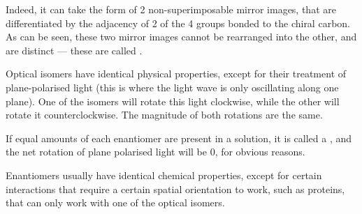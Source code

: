 			Indeed, it can take the form of 2 non-superimposable mirror images, that are differentiated by the adjacency of 2 of
			the 4 groups bonded to the chiral carbon. As can be seen, these two mirror images cannot be rearranged into the other,
			and are distinct --- these are called .



			Optical isomers have identical physical properties, except for their treatment of plane-polarised light (this is
			where the light wave is only oscillating along one plane). One of the isomers will rotate this light clockwise, while the
			other will rotate it counterclockwise. The magnitude of both rotations are the same.

			If equal amounts of each enantiomer are present in a solution, it is called a , and the net
			rotation of plane polarised light will be 0, for obvious reasons.

			Enantiomers usually have identical chemical properties, except for certain interactions that require a certain spatial
			orientation to work, such as proteins, that can only work with one of the optical isomers.


















